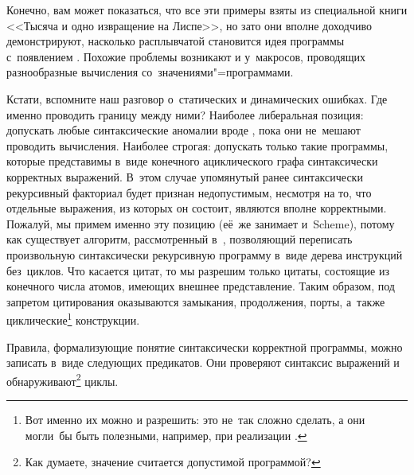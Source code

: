 Конечно, вам может показаться, что все эти примеры взяты из специальной книги
<<Тысяча и одно извращение на Лиспе>>, но зато они вполне доходчиво
демонстрируют, насколько расплывчатой становится идея программы с~появлением
. Похожие проблемы возникают и у~макросов, проводящих разнообразные
вычисления со~значениями"=программами.

Кстати, вспомните наш разговор о~статических и динамических ошибках.
 Где именно проводить границу
между ними? Наиболее либеральная позиция: допускать любые синтаксические
аномалии вроде , пока они не~мешают проводить вычисления.
Наиболее строгая: допускать только такие программы, которые представимы в~виде
конечного ациклического графа синтаксически корректных выражений. В~этом случае
упомянутый ранее синтаксически рекурсивный факториал будет признан недопустимым,
несмотря на то, что отдельные выражения, из которых он состоит, являются вполне
корректными. Пожалуй, мы примем именно эту позицию (её~же занимает и~Scheme),
потому как существует алгоритм, рассмотренный в~\cite{que92a}, позволяющий
переписать произвольную синтаксически рекурсивную программу в~виде дерева
инструкций без~циклов. Что касается цитат, то мы разрешим только цитаты,
состоящие из конечного числа атомов, имеющих внешнее представление. Таким
образом, под запретом цитирования оказываются замыкания, продолжения, порты,
а~также циклические\footnote{Вот именно их можно и разрешить: это не~так сложно
сделать, а они могли~бы быть полезными, например, при реализации \Meroonet.}
конструкции.

Правила, формализующие понятие синтаксически корректной программы, можно
записать в~виде следующих предикатов. Они проверяют синтаксис выражений и
обнаруживают\footnote{Как думаете, значение  считается допустимой программой?} циклы.

